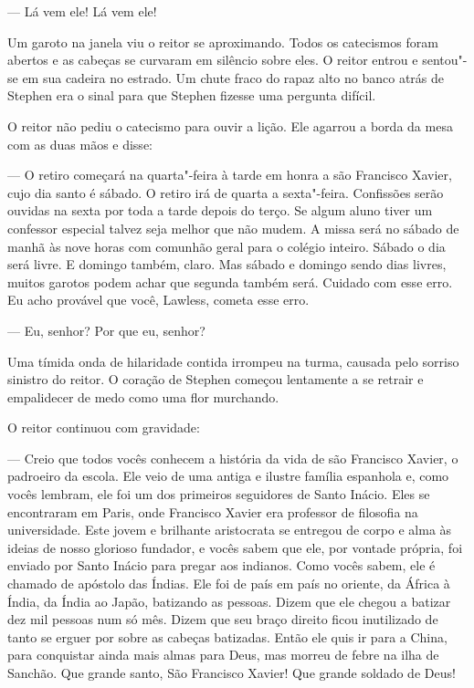  --- Lá vem ele! Lá vem ele!

Um garoto na janela viu o reitor se aproximando. Todos os catecismos
foram abertos e as cabeças se curvaram em silêncio sobre eles. O reitor
entrou e sentou"-se em sua cadeira no estrado. Um chute fraco do rapaz
alto no banco atrás de Stephen era o sinal para que Stephen fizesse uma
pergunta difícil.

O reitor não pediu o catecismo para ouvir a lição. Ele agarrou a borda
da mesa com as duas mãos e disse:

 --- O retiro começará na quarta"-feira à tarde em honra a são Francisco
Xavier, cujo dia santo é sábado. O retiro irá de quarta a sexta"-feira.
Confissões serão ouvidas na sexta por toda a tarde depois do terço. Se
algum aluno tiver um confessor especial talvez seja melhor que não
mudem. A missa será no sábado de manhã às nove horas com comunhão geral
para o colégio inteiro. Sábado o dia será livre. E domingo também,
claro. Mas sábado e domingo sendo dias livres, muitos garotos podem
achar que segunda também será. Cuidado com esse erro. Eu acho provável
que você, Lawless, cometa esse erro.

 --- Eu, senhor? Por que eu, senhor?

Uma tímida onda de hilaridade contida irrompeu na turma, causada pelo
sorriso sinistro do reitor. O coração de Stephen começou lentamente a
se retrair e empalidecer de medo como uma flor murchando.

O reitor continuou com gravidade:

--- Creio que todos vocês conhecem a história da vida de são Francisco
Xavier, o padroeiro da escola. Ele veio de uma antiga e ilustre família
espanhola e, como vocês lembram, ele foi um dos primeiros seguidores de
Santo Inácio. Eles se encontraram em Paris, onde Francisco Xavier era
professor de filosofia na universidade. Este jovem e brilhante
aristocrata se entregou de corpo e alma às ideias de nosso glorioso
fundador, e vocês sabem que ele, por vontade própria, foi enviado por
Santo Inácio para pregar aos indianos. Como vocês sabem, ele é chamado
de apóstolo das Índias. Ele foi de país em país no oriente, da África à
Índia, da Índia ao Japão, batizando as pessoas. Dizem que ele chegou a
batizar dez mil pessoas num só mês. Dizem que seu braço direito ficou
inutilizado de tanto se erguer por sobre as cabeças batizadas. Então
ele quis ir para a China, para conquistar ainda mais almas para Deus,
mas morreu de febre na ilha de Sanchão. Que grande santo, São
Francisco Xavier! Que grande soldado de Deus!

